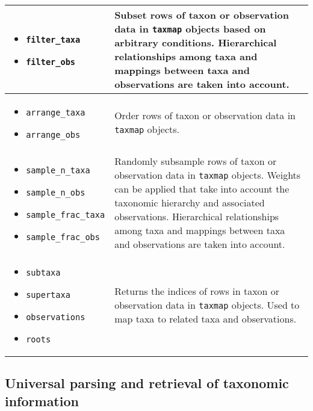 \documentclass[10pt,letterpaper]{article}
\begin{document}
\begin{table}
\begin{tabular}[t]{p{5cm}  p{10cm}}
\begin{itemize}
\item \texttt{filter\_taxa}
\item \texttt{filter\_obs}
\end{itemize} & Subset rows of taxon or observation data in \texttt{taxmap} objects based on arbitrary conditions. Hierarchical relationships among taxa and mappings between taxa and observations are taken into account.  \\
\hline
\begin{itemize}
\item \texttt{arrange\_taxa}
\item \texttt{arrange\_obs}
\end{itemize} & Order rows of taxon or observation data in \texttt{taxmap} objects.  \\
\hline
\begin{itemize}
\item \texttt{sample\_n\_taxa}
\item \texttt{sample\_n\_obs}
\item \texttt{sample\_frac\_taxa}
\item \texttt{sample\_frac\_obs}
\end{itemize} & Randomly subsample rows of taxon or observation data in \texttt{taxmap} objects. Weights can be applied that take into account the taxonomic hierarchy and associated observations. Hierarchical relationships among taxa and mappings between taxa and observations are taken into account. \\
\hline
\begin{itemize}
\item \texttt{subtaxa}
\item \texttt{supertaxa}
\item \texttt{observations}
\item \texttt{roots}
\end{itemize} & Returns the indices of rows in taxon or observation data in \texttt{taxmap} objects. Used to map taxa to related taxa and observations.  \\
\hline
\end{tabular}
\end{table}


\subsection*{Universal parsing and retrieval of taxonomic
information}\label{universal-parsing-and-retrieval-of-taxonomic-information}
\end{document}
